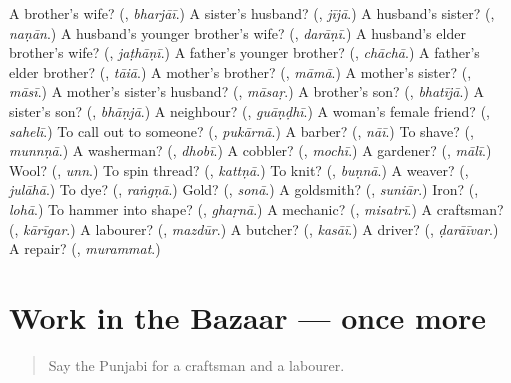 \begin{tcolorbox}[breakable,colback=teal!4,colframe=teal!35!black,title={Before you move on}]
A brother's wife? (\textbf{}, \emph{bharjāī}.) A sister's husband? (\textbf{}, \emph{jījā}.) A husband's sister? (\textbf{}, \emph{naṇān}.) A husband's younger brother's wife? (\textbf{}, \emph{darāṇī}.) A husband's elder brother's wife? (\textbf{}, \emph{jaṭhāṇī}.) A father's younger brother? (\textbf{}, \emph{chāchā}.) A father's elder brother? (\textbf{}, \emph{tāiā}.) A mother's brother? (\textbf{}, \emph{māmā}.) A mother's sister? (\textbf{}, \emph{māsī}.) A mother's sister's husband? (\textbf{}, \emph{māsaṛ}.) A brother's son? (\textbf{}, \emph{bhatījā}.) A sister's son? (\textbf{}, \emph{bhāṇjā}.) A neighbour? (\textbf{}, \emph{guāṇḍhī}.) A woman's female friend? (\textbf{}, \emph{sahelī}.) To call out to someone? (\textbf{}, \emph{pukārnā}.) A barber? (\textbf{}, \emph{nāī}.) To shave? (\textbf{}, \emph{munnṇā}.) A washerman? (\textbf{}, \emph{dhobī}.) A cobbler? (\textbf{}, \emph{mochī}.) A gardener? (\textbf{}, \emph{mālī}.) Wool? (\textbf{}, \emph{unn}.) To spin thread? (\textbf{}, \emph{kattṇā}.) To knit? (\textbf{}, \emph{buṇnā}.) A weaver? (\textbf{}, \emph{julāhā}.) To dye? (\textbf{}, \emph{raṅgṇā}.) Gold? (\textbf{}, \emph{sonā}.) A goldsmith? (\textbf{}, \emph{suniār}.) Iron? (\textbf{}, \emph{lohā}.) To hammer into shape? (\textbf{}, \emph{ghaṛnā}.) A mechanic? (\textbf{}, \emph{misatrī}.) A craftsman? (\textbf{}, \emph{kārīgar}.) A labourer? (\textbf{}, \emph{mazdūr}.) A butcher? (\textbf{}, \emph{kasāī}.) A driver? (\textbf{}, \emph{ḍarāīvar}.) A repair? (\textbf{}, \emph{murammat}.)
\end{tcolorbox}
\section[(dialogue)]{Work in the Bazaar — once more}

\label{lesson:PA-R336-review-final-336}



\begin{quote}
Say the Punjabi for a craftsman and a labourer.
\end{quote}

